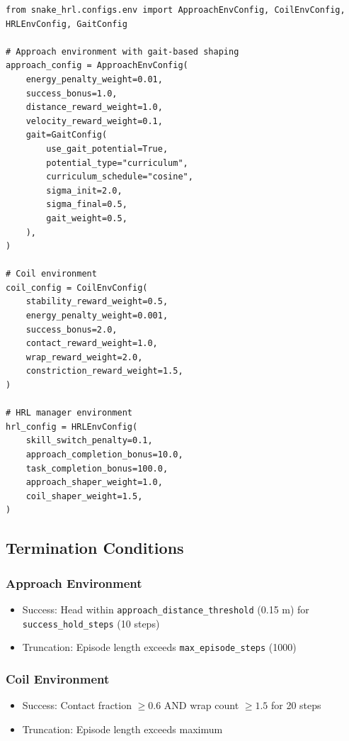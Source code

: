 \documentclass[11pt]{article}
\begin{document}
\begin{listing}[H]
\begin{verbatim}
from snake_hrl.configs.env import ApproachEnvConfig, CoilEnvConfig, HRLEnvConfig, GaitConfig

# Approach environment with gait-based shaping
approach_config = ApproachEnvConfig(
    energy_penalty_weight=0.01,
    success_bonus=1.0,
    distance_reward_weight=1.0,
    velocity_reward_weight=0.1,
    gait=GaitConfig(
        use_gait_potential=True,
        potential_type="curriculum",
        curriculum_schedule="cosine",
        sigma_init=2.0,
        sigma_final=0.5,
        gait_weight=0.5,
    ),
)

# Coil environment
coil_config = CoilEnvConfig(
    stability_reward_weight=0.5,
    energy_penalty_weight=0.001,
    success_bonus=2.0,
    contact_reward_weight=1.0,
    wrap_reward_weight=2.0,
    constriction_reward_weight=1.5,
)

# HRL manager environment
hrl_config = HRLEnvConfig(
    skill_switch_penalty=0.1,
    approach_completion_bonus=10.0,
    task_completion_bonus=100.0,
    approach_shaper_weight=1.0,
    coil_shaper_weight=1.5,
)
\end{verbatim}
\caption{Configuring Reward Shaping}
\end{listing}

\subsection{Termination Conditions}

\subsubsection{Approach Environment}
\begin{itemize}
    \item Success: Head within \texttt{approach\_distance\_threshold} (0.15 m) for \texttt{success\_hold\_steps} (10 steps)
    \item Truncation: Episode length exceeds \texttt{max\_episode\_steps} (1000)
\end{itemize}

\subsubsection{Coil Environment}
\begin{itemize}
    \item Success: Contact fraction $\geq 0.6$ AND wrap count $\geq 1.5$ for 20 steps
    \item Truncation: Episode length exceeds maximum
\end{itemize}
\end{document}
